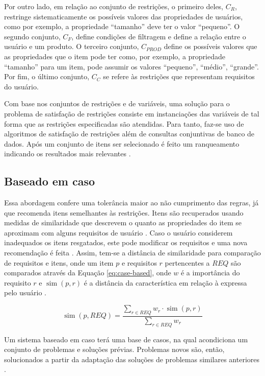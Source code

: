     Por outro lado, em relação ao conjunto de restrições, o primeiro deles, $C_R$, restringe sistematicamente os possíveis valores das propriedades de usuários, como por exemplo, a propriedade ``tamanho'' deve ter o valor ``pequeno''.
    O segundo conjunto, $C_F$, define condições de filtragem e define a relação entre o usuário e um produto. O terceiro conjunto, $C_{PROD}$ define os possíveis valores que as propriedades que o item pode ter como, por exemplo, a propriedade ``tamanho'' para um item, pode assumir os valores ``pequeno'', ``médio'', ``grande''. Por fim, o último conjunto, $C_C$ se refere às restrições que representam requisitos do usuário.
    
    Com base nos conjuntos de restrições e de variáveis, uma solução para o problema de satisfação de restrições consiste em instanciações das variáveis de tal forma que as restrições especificadas são atendidas. Para tanto, faz-se uso de algoritmos de satisfação de restrições além de consultas conjuntivas de banco de dados. Após um conjunto de itens ser selecionado é feito um ranqueamento indicando os resultados mais relevantes \cite{Ricci2010}.
    
\subsection{Baseado em caso}
    Essa abordagem confere uma tolerância maior ao não cumprimento das regras, já que recomenda itens semelhantes às restrições. Itens são recuperados usando medidas de similaridade que descrevem o quanto as propriedades do item se aproximam com alguns requisitos de usuário \cite{Aggarwal2016}. Caso o usuário considerem inadequados os itens resgatados, este pode modificar os requisitos e uma nova recomendação é feita \cite{Lorenzi2005}.
    Assim, tem-se a distância de similaridade para comparação de requisitos e itens, onde um item $p$ e requisitos $r$ pertencentes a $REQ$ são comparados através da Equação \ref{eq:case-based}, onde $w$ é a importância do requisito $r$ e $\operatorname{sim}(p, r)$ é a distância da característica em relação à expressa pelo usuário \cite{Jannach2010}. 
    
    \begin{equation}
        \operatorname{sim}(p, REQ) = \frac{\sum_{r \in REQ}w_r \cdot \operatorname{sim}(p,r)}{\sum_{r \in REQ}w_r} \label{eq:case-based}
    \end{equation}
    
    Um sistema baseado em caso terá uma base de casos, na qual acondiciona um conjunto de problemas e soluções prévias. Problemas novos são, então, solucionados a partir da adaptação das soluções de problemas similares anteriores \cite{Bridge2005}. 
            
